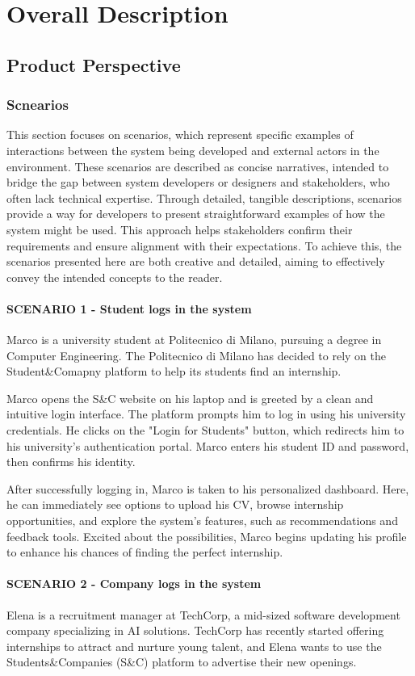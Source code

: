 \chapter{Overall Description}

\section{Product Perspective}
\subsection{Scnearios}
This section focuses on scenarios, which represent specific examples of interactions between
the system being developed and external actors in the environment. These scenarios are described
as concise narratives, intended to bridge the gap between system developers or designers and stakeholders,
who often lack technical expertise. Through detailed, tangible descriptions, scenarios provide a way for
developers to present straightforward examples of how the system might be used. This approach helps
stakeholders confirm their requirements and ensure alignment with their expectations. To achieve this,
the scenarios presented here are both creative and detailed, aiming to effectively convey the intended
concepts to the reader.
\subsubsection{SCENARIO 1 - Student logs in the system}
Marco is a university student at Politecnico di Milano, pursuing a degree in Computer Engineering.
The Politecnico di Milano has decided to rely on the Student\&Comapny platform to help its students
find an internship. 

Marco opens the S\&C website on his laptop and is greeted by a clean and intuitive login interface.
The platform prompts him to log in using his university credentials. He clicks on the "Login for Students"
button, which redirects him to his university’s authentication portal. Marco enters his student ID
and password, then confirms his identity.  

After successfully logging in, Marco is taken to his personalized dashboard. Here, he can immediately
see options to upload his CV, browse internship opportunities, and explore the system's features, such
as recommendations and feedback tools. Excited about the possibilities, Marco begins updating his
profile to enhance his chances of finding the perfect internship.
\subsubsection{SCENARIO 2 - Company logs in the system}
Elena is a recruitment manager at TechCorp, a mid-sized software development company specializing
in AI solutions. TechCorp has recently started offering internships to attract and nurture young talent,
and Elena wants to use the Students\&Companies (S\&C) platform to advertise their new openings.  

